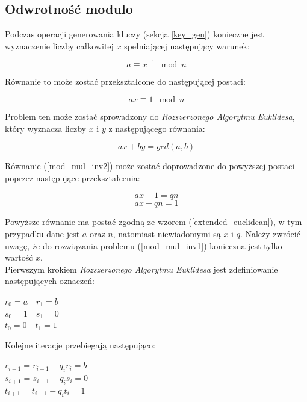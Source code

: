 \documentclass[10pt,a4paper]{article}
\begin{document}
\subsection{Odwrotność modulo} \label{mod_inv}
Podczas operacji generowania kluczy (sekcja \ref{key_gen}) konieczne jest wyznaczenie liczby całkowitej $x$ spełniającej następujący warunek:

\begin{equation} 
\label{mod_mul_inv1}
a \equiv x^{-1} \mod n
\end{equation}

Równanie to może zostać przekształcone do następującej postaci:

\begin{equation}
\label{mod_mul_inv2}
ax \equiv 1 \mod n
\end{equation}

Problem ten może zostać sprowadzony do \textit{Rozszerzonego Algorytmu Euklidesa}, który wyznacza liczby $x$ i $y$ z następującego równania:

\begin{equation}
\label{extended_euclidean}
ax + by = gcd(a,b)
\end{equation}

Równanie (\ref{mod_mul_inv2}) może zostać doprowadzone do powyższej postaci poprzez następujące przekształcenia:

\begin{equation}
ax - 1 = qn
\end{equation}
\begin{equation}
ax - qn = 1
\end{equation}

Powyższe równanie ma postać zgodną ze wzorem (\ref{extended_euclidean}), w tym przypadku dane jest $a$ oraz $n$, natomiast niewiadomymi są $x$ i $q$. Należy zwrócić uwagę, że do rozwiązania problemu (\ref{mod_mul_inv1}) konieczna jest tylko wartość $x$.\\

Pierwszym krokiem \textit{Rozszerzonego Algorytmu Euklidesa} jest zdefiniowanie następujących oznaczeń:

\begin{center}
$r_{0} = a \quad r_{1} = b$\\
$s_{0} = 1 \quad s_{1} = 0$\\
$t_{0} = 0 \quad t_{1} = 1$
\end{center}

Kolejne iteracje przebiegają następująco:

\begin{center}
$r_{i+1} = r_{i-1} - q_{i} r_{i} = b$\\
$s_{i+1} = s_{i-1} - q_{i} s_{i} = 0$\\
$t_{i+1} = t_{i-1} - q_{i} t_{i} = 1$
\end{center}
\end{document}
